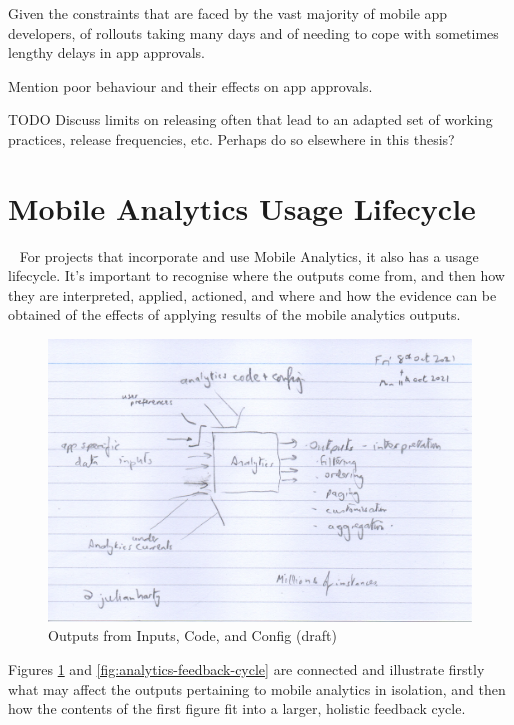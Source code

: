Given the constraints that are faced by the vast majority of mobile app developers, of rollouts taking many days and of needing to cope with sometimes lengthy delays in app approvals. 

Mention poor behaviour and their effects on app approvals.

TODO Discuss limits on releasing often that lead to an adapted set of working practices, release frequencies, etc. Perhaps do so elsewhere in this thesis?


\section{Mobile Analytics Usage Lifecycle}~\label{section-mobile-analytics-usage-lifecycle}
For projects that incorporate and use Mobile Analytics, it also has a usage lifecycle. It's important to recognise where the outputs come from, and then how they are interpreted, applied, actioned, and where and how the evidence can be obtained of the effects of applying results of the mobile analytics outputs.

\begin{figure}
    \includegraphics[width=\linewidth]{images/rough-sketches/outputs_from_inputs_code_config-11-oct-2021.jpeg}
    \caption{Outputs from Inputs, Code, and Config (draft)}
    \label{fig:outputs_from_inputs_code_config}
\end{figure}

Figures \ref{fig:outputs_from_inputs_code_config} and \ref{fig:analytics-feedback-cycle} are connected and illustrate firstly what may affect the outputs pertaining to mobile analytics in isolation, and then how the contents of the first figure fit into a larger, holistic feedback cycle. 

